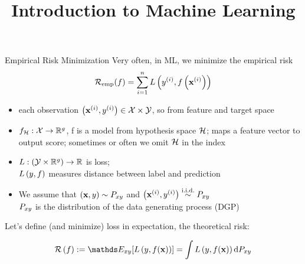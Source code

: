 \documentclass[11pt,compress,t,notes=noshow, xcolor=table]{beamer}
\title{Introduction to Machine Learning}
\begin{document}
    

\begin{vbframe}{Empirical Risk Minimization}
Very often, in ML, we minimize the empirical risk
\vspace{-0.3cm}
$$\mathcal{R}_{\text{emp}}(f) = \sum\limits_{i=1}^n L\left(y^{(i)}, f\left(\mathbf{x}^{(i)}\right)\right)$$
\vspace{-0.2cm}
{\small
\begin{itemize}\setlength\itemsep{0.5pt} 
    \item each observation $\left(\mathbf{x}^{(i)}, y^{(i)}\right) \in  \mathcal{X} \times \mathcal{Y}$,
    so from feature and target space
    \item $f_{\mathcal{H}}:\mathcal{X} \rightarrow \mathbb{R}^g$, 
    f is a model from hypothesis space $\mathcal{H}$;
    maps a feature vector to output score;
    sometimes or often we omit $\mathcal{H}$ in the index 
    \item $L:\left(\mathcal{Y}\times\mathbb{R}^g\right)\rightarrow\mathbb{R}$ is loss;\\
    $L\left(y, f\right)$ measures distance between label and prediction
    \item We assume that $(\mathbf{x},y) \sim P_{xy}$ and $\left(\mathbf{x}^{(i)}, y^{(i)}\right)  \overset{\text{i.i.d.}}{\sim} P_{xy}$ \\
    $P_{xy}$ is the distribution of the data generating process (DGP)
\end{itemize}
}
Let's define (and minimize) loss in expectation, the theoretical risk:

$$ \risk \left(f\right) := \E_{xy} [\Lxy] = \int \Lxy \text{d}\Pxy $$
\end{vbframe}
\end{document}
